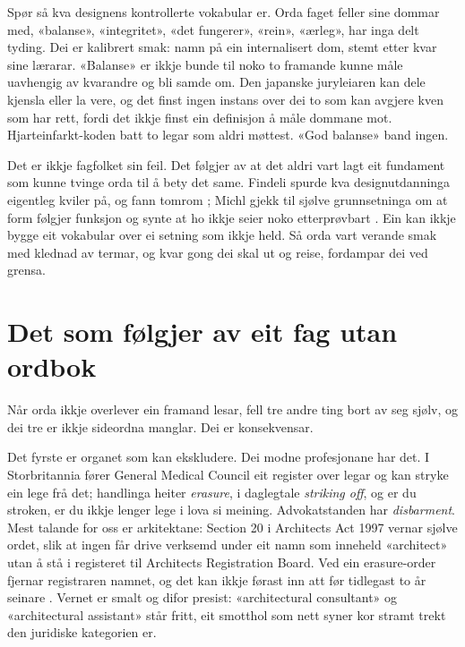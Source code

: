 Spør så kva designens kontrollerte vokabular er. Orda faget feller sine dommar med, «balanse», «integritet», «det fungerer», «rein», «ærleg», har inga delt tyding. Dei er kalibrert smak: namn på ein internalisert dom, stemt etter kvar sine lærarar. «Balanse» er ikkje bunde til noko to framande kunne måle uavhengig av kvarandre og bli samde om. Den japanske juryleiaren kan dele kjensla eller la vere, og det finst ingen instans over dei to som kan avgjere kven som har rett, fordi det ikkje finst ein definisjon å måle dommane mot. Hjarteinfarkt-koden batt to legar som aldri møttest. «God balanse» band ingen.

Det er ikkje fagfolket sin feil. Det følgjer av at det aldri vart lagt eit fundament som kunne tvinge orda til å bety det same. Findeli spurde kva designutdanninga eigentleg kviler på, og fann tomrom \autocite{findeli2001}; Michl gjekk til sjølve grunnsetninga om at form følgjer funksjon og synte at ho ikkje seier noko etterprøvbart \autocite{michl2014}. Ein kan ikkje bygge eit vokabular over ei setning som ikkje held. Så orda vart verande smak med klednad av termar, og kvar gong dei skal ut og reise, fordampar dei ved grensa.

\section{Det som følgjer av eit fag utan ordbok}

Når orda ikkje overlever ein framand lesar, fell tre andre ting bort av seg sjølv, og dei tre er ikkje sideordna manglar. Dei er konsekvensar.

Det fyrste er organet som kan ekskludere. Dei modne profesjonane har det. I Storbritannia fører General Medical Council eit register over legar og kan stryke ein lege frå det; handlinga heiter \emph{erasure}, i daglegtale \emph{striking off}, og er du stroken, er du ikkje lenger lege i lova si meining. Advokatstanden har \emph{disbarment}. Mest talande for oss er arkitektane: Section 20 i Architects Act 1997 vernar sjølve ordet, slik at ingen får drive verksemd under eit namn som inneheld «architect» utan å stå i registeret til Architects Registration Board. Ved ein erasure-order fjernar registraren namnet, og det kan ikkje førast inn att før tidlegast to år seinare \autocite{riba2019code}. Vernet er smalt og difor presist: «architectural consultant» og «architectural assistant» står fritt, eit smotthol som nett syner kor stramt trekt den juridiske kategorien er.

